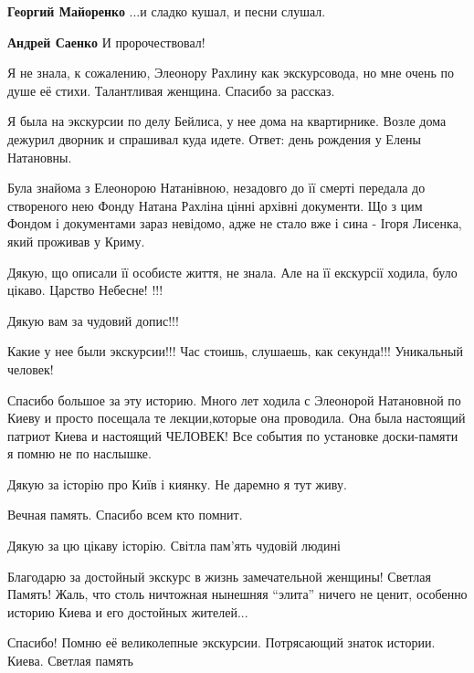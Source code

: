 \begin{itemize}
\begin{itemize}
\textbf{Георгий Майоренко} ...и сладко кушал, и песни слушал.

\textbf{Андрей Саенко} И пророчествовал!
\end{itemize} %


Я не знала, к сожалению, Элеонору Рахлину как экскурсовода, но мне очень по
душе её стихи. Талантливая женщина. Спасибо за рассказ.



Я была на экскурсии по делу Бейлиса, у нее дома на квартирнике. Возле дома
дежурил дворник и спрашивал куда идете. Ответ: день рождения у Елены Натановны.



Була знайома з Елеонорою Натанівною, незадовго до її смерті передала до
створеного нею Фонду Натана Рахліна цінні архівні документи. Що з цим Фондом і
документами зараз невідомо, адже не стало вже і сина - Ігоря Лисенка, який
проживав у Криму.

Дякую, що описали її особисте життя, не знала.
Але на її екскурсії ходила, було цікаво.
Царство Небесне! !!!

Дякую вам за чудовий допис!!!

Какие у нее были экскурсии!!! Час стоишь, слушаешь, как секунда!!! Уникальный человек!


Спасибо большое за эту историю. Много лет ходила с Элеонорой Натановной по
Киеву и просто посещала те лекции,которые она проводила. Она была настоящий
патриот Киева и настоящий ЧЕЛОВЕК! Все события по установке доски-памяти я
помню не по наслышке.

Дякую за історію про Київ і киянку. Не даремно я тут живу.

Вечная память. Спасибо всем кто помнит.

Дякую за цю цікаву історію. Світла пам'ять чудовій людині


Благодарю за достойный экскурс в жизнь замечательной женщины! Светлая Память!
Жаль, что столь ничтожная нынешняя \enquote{элита} ничего не ценит, особенно историю
Киева и его достойных жителей...


Спасибо! Помню её великолепные экскурсии. Потрясающий знаток истории. Киева. Светлая память


\end{itemize}
